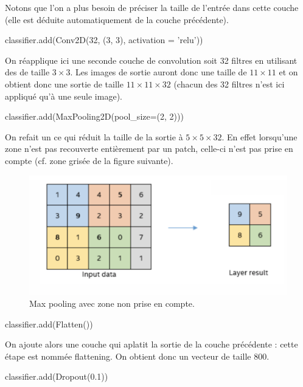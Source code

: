 Notons que l'on a plus besoin de préciser la taille de l'entrée dans cette 
couche (elle est déduite automatiquement de la couche précédente).

\begin{codeblock}
classifier.add(Conv2D(32, (3, 3), activation = 'relu'))
\end{codeblock}

On réapplique ici une seconde couche de convolution soit 32 filtres en utilisant des 
 de taille $3 \times 3$. 
Les images de sortie auront donc une taille de $11 \times 11$ et on obtient donc une 
sortie de taille $11 \times 11 \times 32$ (chacun des 32 filtres n'est ici appliqué qu'à 
une seule image).

\begin{codeblock}
classifier.add(MaxPooling2D(pool_size=(2, 2)))
\end{codeblock}

On refait un  ce qui réduit la taille de la sortie 
à $5 \times 5 \times 32$. En effet lorsqu'une zone n'est pas recouverte entièrement par 
un patch, celle-ci n'est pas prise en compte (cf. zone grisée de la figure suivante).

\begin{figure}[h]
  \centering
  \includegraphics[scale=0.5]{assets/max-pooling-reduced}
  \caption{Max pooling avec zone non prise en compte.}
  \label{fig:max-pooling-reduced}
\end{figure}

\begin{codeblock}
classifier.add(Flatten())
\end{codeblock}

On ajoute alors une couche qui aplatit la sortie de la couche précédente : cette étape est 
nommée flattening.
On obtient donc un vecteur de taille $800$.


\begin{codeblock}
classifier.add(Dropout(0.1)) 
\end{codeblock}

